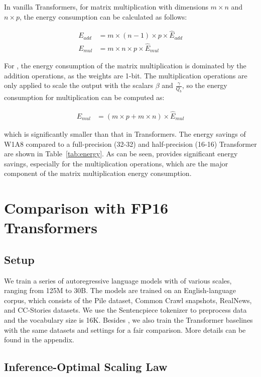 In vanilla Transformers, for matrix multiplication with dimensions $m \times n$ and $n \times p$, the energy consumption can be calculated as follows:

\begin{align}
E_{add} &= m \times (n-1) \times p \times \hat{E}_{add} \\
E_{mul} &= m \times n \times p \times \hat{E}_{mul}
\end{align}

For \our{}, the energy consumption of the matrix multiplication is dominated by the addition operations, as the weights are 1-bit. The multiplication operations are only applied to scale the output with the scalars $\beta$ and $\frac{\gamma}{Q_b}$, so the energy consumption for multiplication can be computed as:

\begin{align}
E_{mul} &= (m \times p + m \times n) \times \hat{E}_{mul}
\end{align}

which is significantly smaller than that in Transformers. The energy savings of W1A8 \our{} compared to a full-precision (32-32) and half-precision (16-16) Transformer are shown in Table~\ref{tab:energy}. As can be seen, \our{} provides significant energy savings, especially for the multiplication operations, which are the major component of the matrix multiplication energy consumption.

\section{Comparison with FP16 Transformers}
\label{experiment}

\subsection{Setup}
\label{sec:setup}

We train a series of autoregressive language models with \our{} of various scales, ranging from 125M to 30B. The models are trained on an English-language corpus, which consists of the Pile dataset, Common Crawl snapshots, RealNews, and CC-Stories datasets. We use the Sentencpiece tokenizer to preprocess data and the vocabulary size is 16K. Besides \our{}, we also train the Transformer baselines with the same datasets and settings for a fair comparison. More details can be found in the appendix.

\subsection{Inference-Optimal Scaling Law}

